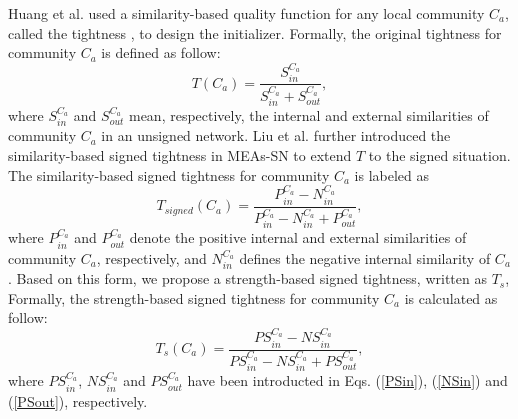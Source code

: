 \documentclass[10pt, journal]{IEEEtran}
\begin{document}
Huang et al. used a similarity-based quality function for any local community $C_a$, called the tightness \cite{huang2011towards}, to design the initializer. Formally, the original tightness for community $C_a$ is defined as follow:
\begin{equation}
T(C_a)=\frac{S_{in}^{C_a}}{S_{in}^{C_a}+S_{out}^{C_a}},
\end{equation}
where $S_{in}^{C_a}$ and $S_{out}^{C_a}$ mean, respectively, the internal and external similarities of community $C_a$ in an unsigned network. Liu et al. further introduced the similarity-based signed tightness \cite{liu2014multiobjective} in MEAs-SN to extend $T$ to the signed situation. The similarity-based signed tightness for community $C_a$ is labeled as
\begin{equation}\label{section:CAEAqSN:MEAsTsigned}
T_{signed}(C_a)= \frac{P_{in}^{C_a}-N_{in}^{C_a}}{P_{in}^{C_a}-N_{in}^{C_a}+P_{out}^{C_a}},
\end{equation}
where $P_{in}^{C_a}$ and $P_{out}^{C_a}$ denote the positive internal and external similarities of community $C_a$, respectively, and $N_{in}^{C_a}$ defines the negative internal similarity of $C_a$. Based on this form, we propose a strength-based signed tightness, written as $T_s$,
Formally, the strength-based signed tightness for community $C_a$
is calculated as follow:
\begin{equation}\label{eqn:CAEAh-SN_Ts}
T_{s}(C_a)= \frac{PS_{in}^{C_a}-NS_{in}^{C_a}}{PS_{in}^{C_a}-NS_{in}^{C_a}+PS_{out}^{C_a}},
\end{equation}
where $PS_{in}^{C_a}$, $NS_{in}^{C_a}$ and $PS_{out}^{C_a}$ have been introducted in Eqs. (\ref{PSin}), (\ref{NSin}) and  (\ref{PSout}), respectively. 
\end{document}

